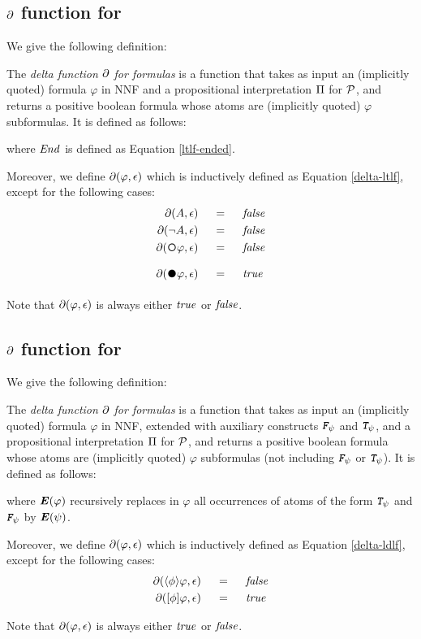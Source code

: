 \subsection{$\partial$ function for \LTLf}\label{ltlf-delta-section}
We give the following definition:
\begin{definition}\label{ltlf-delta-def}
	The \emph{delta function $\partial$ for \LTLf formulas} is a function that takes as input an (implicitly quoted) \LTLf
	formula $\varphi$ in NNF and a propositional interpretation $\Pi$ for $\mathcal{P}$, and returns a positive boolean formula whose atoms are (implicitly
	quoted) $\varphi$ subformulas. It is defined as follows:
	
	where $\mathit{End}$ is defined as Equation \ref{ltlf-ended}.
		
	Moreover, we define $\partial\lparen \varphi, \epsilon\rparen$ which is inductively defined as Equation \ref{delta-ltlf}, except for the following cases:
	\begin{align}
	\begin{aligned}
	\DfunEps{A} 			\ind &= \ind \false\\
	\DfunEps{\lnot A} 			\ind &= \ind  \false\\
	\DfunEps{\Next \varphi} 	\ind &= \ind   \false\\
	\DfunEps{\Wnext \varphi} 	\ind &= \ind   \true
	\label{delta-ltlf-eps}
	\end{aligned}					
	\end{align}
\end{definition}
Note that $\partial\lparen \varphi, \epsilon\rparen$ is always either $\mathit{true}$ or $\mathit{false}$.
\subsection{$\partial$ function for \LDLf} \label{ldlf-delta-section}
We give the following definition:
\begin{definition}\label{ldlf-delta-def}
	The \emph{delta function $\partial$ for \LDLf formulas} is a function that takes as input an (implicitly quoted) \LDLf
	formula $\varphi$ in NNF, extended with auxiliary constructs $\textit{\textbf{\texttt{F}}}_{\psi}$ and $\textit{\textbf{\texttt{T}}}_{\psi}$, and a propositional interpretation $\Pi$ for $\mathcal{P}$, and returns a positive boolean formula whose atoms are (implicitly
	quoted) $\varphi$ subformulas (not including $\textit{\textbf{\texttt{F}}}_{\psi}$ or $\textit{\textbf{\texttt{T}}}_{\psi}$). It is defined as follows:
	
	where $\textbf{\textit{E}} (\varphi)$ recursively replaces in $\varphi$ all occurrences of atoms of the form $\textit{\textbf{\texttt{T}}}_{\psi}$ and $\textit{\textbf{\texttt{F}}}_{\psi}$ by $\textbf{\textit{E}}(\psi)$.
	
	Moreover, we define $\partial\lparen \varphi, \epsilon\rparen$ which is inductively defined as Equation \ref{delta-ldlf}, except for the following cases:
	\begin{align}
	\begin{aligned}
	\partial\lparen \langle \phi \rangle\varphi, \epsilon\rparen 	\hspace*{.18in} &= \hspace*{.18in}   \mathit{false}\\
	\partial\lparen [\phi]\varphi, \epsilon\rparen 	\hspace*{.18in} &= \hspace*{.18in}   \mathit{true}
	\label{delta-ldlf-eps}
	\end{aligned}					
	\end{align}
\end{definition}
Note that $\partial\lparen \varphi, \epsilon\rparen$ is always either $\mathit{true}$ or $\mathit{false}$.
